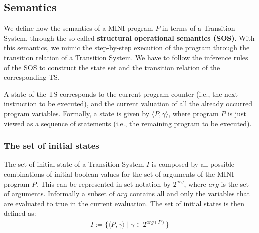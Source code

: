 \documentclass{article}
\begin{document}
\subsection{Semantics}
We define now the semantics of a MINI program $P$ in terms of a Transition System, through the so-called \textbf{structural operational semantics (SOS)}. With this semantics, we mimic the step-by-step execution of the program through the transition relation of a Transition System. We have to follow the inference rules of the SOS to construct the state set and the transition relation of the corresponding TS.

A state of the TS corresponds to the current program counter (i.e., the next instruction to be executed), and the current valuation of all the already occurred program variables.
Formally, a state is given by $\langle P, \gamma \rangle$, where program $P$ is just viewed as a sequence of statements (i.e., the remaining program to be executed). 

\subsubsection{The set of initial states}
The set of initial state of a Transition System $I$ is composed by all possible combinations of initial boolean values for the set of arguments of the MINI program $P$. This can be represented in set notation by $2^{arg}$, where $arg$ is the set of arguments. Informally a subset of $arg$ contains all and only the variables that are evaluated to true in the current evaluation. The set of initial states is then defined as:
\begin{align*}
    I := \{ \langle P, \gamma \rangle \mid \gamma \in 2^{arg(P)} \}
\end{align*}
\end{document}
